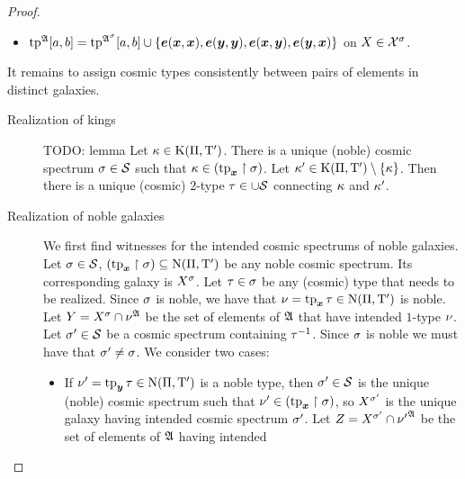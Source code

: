 \begin{proof}
\begin{itemize}
  \item $\operatorname{tp}^{\mathfrak{A}}[a,b] = \operatorname{tp}^{\mathfrak{A}^{\sigma}}[a,b] \cup
\left\{\bm{e}(\bm{x},\bm{x}),\bm{e}(\bm{y},\bm{y}),\bm{e}(\bm{x},\bm{y}),\bm{e}(\bm{y},\bm{x})\right\}$ on $X \in
\mathcal{X}^\sigma$.
\end{itemize}
It remains to assign cosmic types consistently between pairs of elements in
distinct galaxies.
\begin{description}
\item[Realization of kings] TODO: lemma
Let $\kappa \in \mathrm{K}(\Pi,{\mathrm{T}'})$. There is a unique (noble) cosmic spectrum
$\sigma \in \mathcal{S}$ such that $\kappa \in (\operatorname{tp}_{\bm{x}}\restriction\sigma)$.
Let ${\kappa'} \in \mathrm{K}(\Pi,{\mathrm{T}'}) \setminus \left\{\kappa\right\}$. Then there is a unique
(cosmic) $2$-type $\tau \in \cup\mathcal{S}$ connecting $\kappa$ and ${\kappa'}$.
\item[Realization of noble galaxies] We first find witnesses for the intended
cosmic spectrums of noble galaxies. Let $\sigma \in \mathcal{S}$,
$(\operatorname{tp}_{\bm{x}}\restriction\sigma) \subseteq \mathrm{\mathrm{N}}(\Pi,{\mathrm{T}'})$ be any noble cosmic
spectrum. Its corresponding galaxy is $X^\sigma$.
Let $\tau \in \sigma$ be any (cosmic) type that needs to be realized.
Since $\sigma$ is noble, we have that $\nu = \operatorname{tp}_{\bm{x}}\tau \in \mathrm{\mathrm{N}}(\Pi,{\mathrm{T}'})$ is
noble.
Let $Y = X^\sigma \cap \nu^{\mathfrak{A}}$ be the set of elements of $\mathfrak{A}$ that
have intended $1$-type $\nu$.
Let ${\sigma'} \in \mathcal{S}$ be a cosmic spectrum
containing $\tau^{-1}$.
Since $\sigma$ is noble we must have that ${\sigma'} \neq \sigma$. We consider two
cases:
\begin{itemize}
  \item If ${\nu'} = \operatorname{tp}_{\bm{y}}\tau \in \mathrm{\mathrm{N}}(\Pi,{\mathrm{T}'})$ is a noble type, then
  ${\sigma'} \in \mathcal{S}$ is the unique (noble) cosmic spectrum such that ${\nu'} \in
  (\operatorname{tp}_{\bm{x}}\restriction\sigma)$, so $X^{\sigma'}$ is the unique galaxy having
  intended cosmic spectrum ${\sigma'}$. Let $Z = X^{\sigma'} \cap {\nu'}^{\mathfrak{A}}$
  be the set of elements of $\mathfrak{A}$ having intended 
\end{itemize}
\end{description}
\end{proof}
